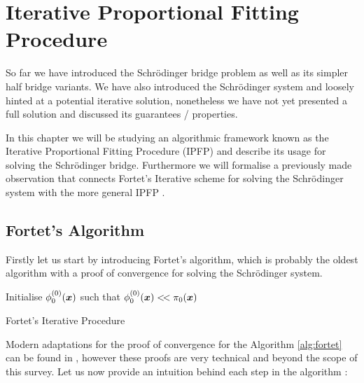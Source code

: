 \documentclass[a4paper,12pt,twoside,openright]{report}
\theoremstyle{definition}
\begin{document}
\chapter{Iterative Proportional Fitting Procedure}

So far we have introduced the Schrödinger bridge problem as well as its simpler half bridge variants. We have also introduced the Schrödinger system and loosely hinted at a potential iterative solution, nonetheless we have not yet presented a full solution and discussed its guarantees / properties.

In this chapter we will be studying an algorithmic framework known as the Iterative Proportional Fitting Procedure (IPFP) \citep{csiszar1975divergence, kullback1968probability, ruschendorf1995convergence,cramer2000probability} and describe its usage for solving the Schrödinger bridge. Furthermore we will formalise a previously made observation that connects Fortet's Iterative scheme \citep{fortet1940resolution} for solving the Schrödinger system with the more general IPFP . 

\section{Fortet's Algorithm}

Firstly let us start by introducing Fortet's algorithm, which is probably the oldest algorithm with a proof of convergence \cite{fortet1940resolution} for solving the Schrödinger system.

\begin{algorithm} \label{alg:fortet}
Initialise $\phi_0^{(0)}({\bm{x}})$ such that $\phi_0^{(0)}({\bm{x}}) <\!< \pi_0({\bm{x}})$ \\
\caption{Fortet's Iterative Procedure}
\end{algorithm}
Modern adaptations for the proof of convergence for the Algorithm  \ref{alg:fortet} can be found in \citep{essid2019traversing, chen2016entropic}, however these proofs are very technical and beyond the scope of this survey.  Let us now provide an intuition behind each step in the algorithm :
\end{document}
